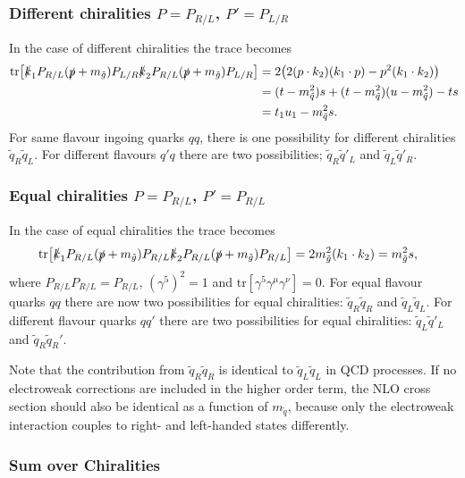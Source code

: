 \documentclass[twoside,english]{uiofysmaster}
\begin{document}
\subsubsection{Different chiralities $P=P_{R/L}$, $P'=P_{L/R}$}
In the case of different chiralities the trace becomes
\begin{align*}
\text{tr} \big[ 
\slashed{k}_1 P_{R/L} (\slashed{p} + m_{\tilde{g}}) P_{L/R} \slashed{k}_2 P_{R/L} (\slashed{p} + m_{\tilde{g}}) P_{L/R} \big]
&= 2 \big(
2 (p \cdot k_2) (k_1 \cdot p) - p^2 (k_1 \cdot k_2)\big)\\
& = (t-m_{\tilde{q}}^2)s + (t-m_{\tilde{q}}^2)(u-m_{\tilde{q}}^2)-  ts\\
&=  t_1u_1 -m_{\tilde{q}}^2s.
\end{align*}
For same flavour ingoing quarks $qq$, there is one possibility for different chiralities $\tilde{q}_R\tilde{q}_L$. For different flavours $q'q$ there are two possibilities; $ \tilde{q}_R \tilde{q}'_L$ and $\tilde{q}_L \tilde{q}'_R$.  


\subsubsection{Equal chiralities $P=P_{R/L}$, $P'=P_{R/L}$}
In the case of equal chiralities the trace becomes
\begin{align*}
\text{tr} \big[ 
\slashed{k}_1 P_{R/L} (\slashed{p} + m_{\tilde{g}}) P_{R/L} \slashed{k}_2 P_{R/L} (\slashed{p} + m_{\tilde{g}}) P_{R/L} \big]&= 2  m_{\tilde{g}}^2 (k_1 \cdot k_2)= m_{\tilde{g}}^2 s,
\end{align*}
where $P_{R/L}P_{R/L} = P_{R/L}$, $(\gamma^5)^2 = 1$ and $\text{tr}[\gamma^5 \gamma^{\mu} \gamma^{\nu}]=0$. For equal flavour quarks $qq$ there are now two possibilities for equal chiralities: $\tilde{q}_R \tilde{q}_R$ and $ \tilde{q}_L \tilde{q}_L$. For different flavour quarks $qq'$ there are two possibilities for equal chiralities: $ \tilde{q}_L \tilde{q}'_L$ and $\tilde{q}_R \tilde{q}_R'$. 

Note that the contribution from $\tilde{q}_R \tilde{q}_R$ is identical to $\tilde{q}_L \tilde{q}_L$ in QCD processes. If no electroweak corrections are included in the higher order term, the NLO cross section should also be identical as a function of $m_{\tilde{q}}$, because only the electroweak interaction couples to right- and left-handed states differently. 

\subsubsection{Sum over Chiralities}
\end{document}
